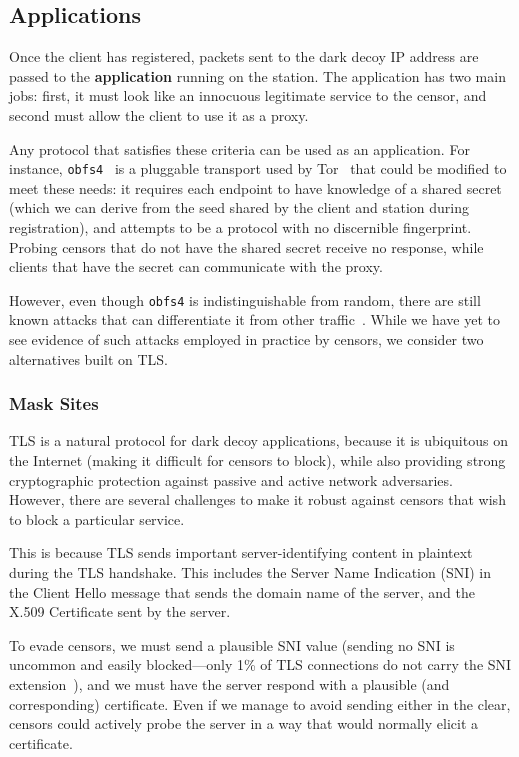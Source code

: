 \documentclass[letterpaper,twocolumn,10pt]{article}
\begin{document}
\subsection{Applications}


Once the client has registered, packets sent to the dark decoy IP address are
passed to the \textbf{application} running on the station. The application has
two main jobs: first, it must look like an innocuous legitimate service to the
censor, and second must allow the client to use it as a proxy.

Any protocol that satisfies these criteria can be used as an application. For
instance, \texttt{obfs4}~\cite{obfs4} is a pluggable transport used by
Tor~\cite{tor} that could be
modified to meet these needs: it requires each endpoint to have knowledge of a
shared secret (which we can derive from the seed shared by the client and
station during registration), and attempts to be a protocol with no discernible
fingerprint. Probing censors that do not have the shared secret receive no
response, while clients that have the secret can communicate with the proxy.

However, even though \texttt{obfs4} is indistinguishable from random, there are
still known attacks that can differentiate it from other
traffic~\cite{wang2015seeing}. While we have yet to see evidence of such attacks
employed in practice by censors, we consider two alternatives built on TLS.


\FigOverview

\subsubsection{Mask Sites}

TLS is a natural protocol for dark decoy applications, because it is ubiquitous on
the Internet (making it difficult for censors to block), while also providing
strong cryptographic protection against passive and active network adversaries.
However, there are several challenges to make it robust against censors that
wish to block a particular service.

This is because TLS sends important server-identifying content in plaintext
during the TLS handshake. This includes the Server Name Indication (SNI) in the
Client Hello message that sends the domain name of the server, and the
X.509 Certificate sent by the server.

To evade censors, we must send a plausible SNI value (sending no SNI is
uncommon and easily blocked---only 1\% of TLS connections do not carry the
SNI extension~\cite{tls-fingerprint}), and we must have the server respond with
a plausible (and corresponding) certificate. Even if we manage to avoid sending
either in the clear, censors could actively probe the server in a
way that would normally elicit a certificate.
\end{document}
